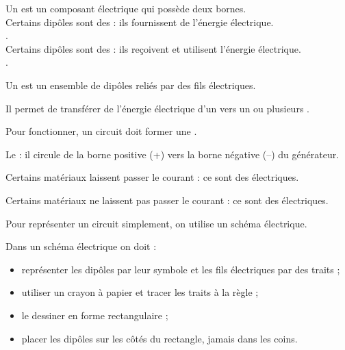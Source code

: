\documentclass[11pt,a4paper]{article}
\begin{document}
\pagination



Un  est un composant électrique qui possède deux bornes. \\[10pt]
Certains dipôles sont des  : ils fournissent de l’énergie électrique. \\[5pt]
. \\[10pt]
Certains dipôles sont des  : ils reçoivent et utilisent l’énergie électrique. \\[5pt]
.


Un  est un ensemble de dipôles reliés par des fils électriques.

Il permet de transférer de l’énergie électrique d’un  vers un ou plusieurs .

Pour fonctionner, un circuit doit former une .

Le  : il circule de la borne positive (+) vers la borne négative (–) du générateur.


Certains matériaux laissent passer le courant : ce sont des  électriques.


Certains matériaux ne laissent pas passer le courant : ce sont des  électriques.



Pour représenter un circuit simplement, on utilise un schéma électrique.

Dans un schéma électrique on doit :
\begin{itemize}
    \item représenter les dipôles par leur symbole et les fils électriques par des traits ;
    \item utiliser un crayon à papier et tracer les traits à la règle ;
    \item le dessiner en forme rectangulaire ;
    \item placer les dipôles sur les côtés du rectangle, jamais dans les coins.
\end{itemize}
\end{document}
